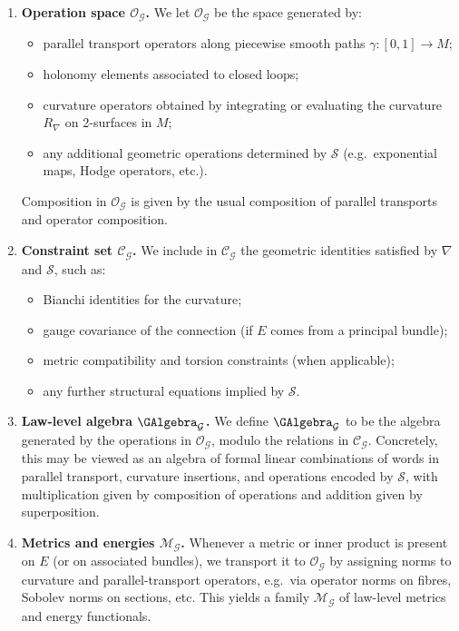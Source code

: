 \documentclass[11pt]{book}
\theoremstyle{plain}
\theoremstyle{definition}
\begin{document}
\begin{enumerate}
  \item \textbf{Operation space \(\mathcal{O}_{\mathcal{G}}\).}  
    We let \(\mathcal{O}_{\mathcal{G}}\) be the space generated by:
    \begin{itemize}
      \item parallel transport operators along piecewise smooth paths
            \(\gamma:[0,1]\to M\);
      \item holonomy elements associated to closed loops;
      \item curvature operators obtained by integrating or evaluating
            the curvature \(R_{\nabla}\) on 2-surfaces in \(M\);
      \item any additional geometric operations determined by
            \(\mathcal{S}\) (e.g.\ exponential maps, Hodge operators,
            etc.).
    \end{itemize}
    Composition in \(\mathcal{O}_{\mathcal{G}}\) is given by the
    usual composition of parallel transports and operator composition.
  \item \textbf{Constraint set \(\mathcal{C}_{\mathcal{G}}\).}  
    We include in \(\mathcal{C}_{\mathcal{G}}\) the geometric identities
    satisfied by \(\nabla\) and \(\mathcal{S}\), such as:
    \begin{itemize}
      \item Bianchi identities for the curvature;
      \item gauge covariance of the connection (if \(E\) comes from a
            principal bundle);
      \item metric compatibility and torsion constraints (when
            applicable);
      \item any further structural equations implied by \(\mathcal{S}\).
    \end{itemize}
  \item \textbf{Law-level algebra \(\GAlgebra_{\mathcal{G}}\).}  
    We define \(\GAlgebra_{\mathcal{G}}\) to be the algebra generated
    by the operations in \(\mathcal{O}_{\mathcal{G}}\), modulo the
    relations in \(\mathcal{C}_{\mathcal{G}}\).  Concretely, this may
    be viewed as an algebra of formal linear combinations of words in
    parallel transport, curvature insertions, and operations encoded
    by \(\mathcal{S}\), with multiplication given by composition of
    operations and addition given by superposition.
  \item \textbf{Metrics and energies \(\mathcal{M}_{\mathcal{G}}\).}  
    Whenever a metric or inner product is present on \(E\) (or on
    associated bundles), we transport it to \(\mathcal{O}_{\mathcal{G}}\)
    by assigning norms to curvature and parallel-transport operators,
    e.g.\ via operator norms on fibres, Sobolev norms on sections,
    etc.  This yields a family \(\mathcal{M}_{\mathcal{G}}\) of
    law-level metrics and energy functionals.
\end{enumerate}
\end{document}
